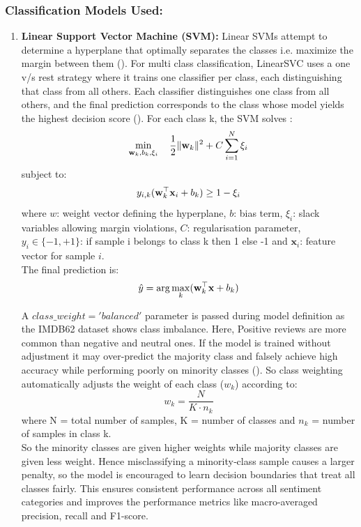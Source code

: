 \documentclass[a4paper,10pt]{article}
\begin{document}
\subsubsection{Classification Models Used:}
\begin{enumerate}[label=\alph*)]
    \item \textbf{Linear Support Vector Machine (SVM):}
Linear SVMs attempt to determine a hyperplane that optimally separates the classes i.e. maximize the margin between them (\cite{SVM2}). For multi class classification, LinearSVC uses a one v/s rest strategy where it trains one classifier per class, each distinguishing that class from all others. Each classifier distinguishes one class from all others, and the final prediction corresponds to the class whose model yields the highest decision score (\cite{SVM}). 
For each class k, the SVM solves :
\[\min _{\mathbf{w_{\mathnormal{k}}},b_k,\xi _i}\quad \frac{1}{2}\| \mathbf{w_{\mathnormal{k}}}\| ^2+C\sum _{i=1}^N\xi _i\]
subject to:
\[y_{i,k}(\mathbf{w_{\mathnormal{k}}^{\mathnormal{\top }}x_{\mathnormal{i}}}+b_k)\geq 1-\xi _i\]
where $w$: weight vector defining the hyperplane, $b$: bias term, $\xi_i$: slack variables allowing margin violations, $C$: regularisation parameter, $y_i \in \{-1, +1\}$: if sample i belongs to class k then 1 else -1 and $\mathbf{x}_i$: feature vector for sample $i$.\\
The final prediction is:
\[\hat {y}=\arg \max _k(\mathbf{w_{\mathnormal{k}}^{\mathnormal{\top }}x}+b_k)\]

A $class\_weight='balanced'$ parameter is passed during model definition as the IMDB62 dataset shows class imbalance. Here, Positive reviews are more common than negative and neutral ones.
If the model is trained without adjustment it may over‑predict the majority class and falsely achieve high accuracy while performing poorly on minority classes (\cite{imbalance}). So class weighting automatically adjusts the weight of each class ($w_k$) according to:
\[w_k=\frac{N}{K\cdot n_k}\]
where N = total number of samples, K = number of classes and $n_{k}$ = number of samples in class k.\\
So the minority classes are given higher weights while majority classes are given less weight. Hence misclassifying a minority‑class sample causes a larger penalty, so the model is encouraged to learn decision boundaries that treat all classes fairly. This ensures consistent performance across all sentiment categories and improves the performance metrics like macro-averaged precision, recall and F1-score.


\end{enumerate}
\end{document}
